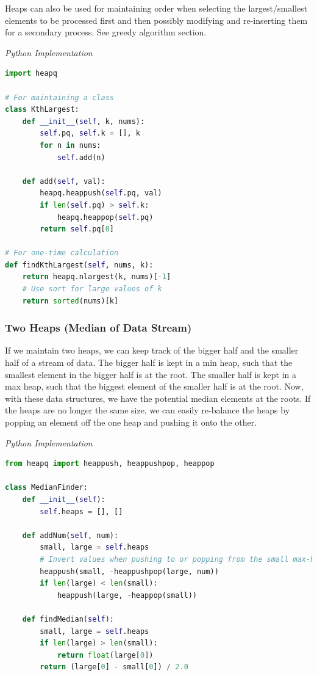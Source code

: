 \documentclass{article}
\begin{document}
    Heaps can also be used for maintaining order when selecting the largest/smallest elements to be processed first and then possibly modifying and re-inserting them for a secondary process. See greedy algorithm section.

\vspace{8pt} \emph{Python Implementation}
\begin{lstlisting}[language=Python]
import heapq

# For maintaining a class 
class KthLargest:
    def __init__(self, k, nums):
        self.pq, self.k = [], k
        for n in nums:
            self.add(n)

    def add(self, val):
        heapq.heappush(self.pq, val)
        if len(self.pq) > self.k:
            heapq.heappop(self.pq)
        return self.pq[0]

# For one-time calculation
def findKthLargest(self, nums, k):
    return heapq.nlargest(k, nums)[-1]
    # Use sort for large values of k
    return sorted(nums)[k]
\end{lstlisting}

    \subsubsection{Two Heaps (Median of Data Stream)}
    If we maintain two heaps, we can keep track of the bigger half and the smaller half of a stream of data. The bigger half is kept in a min heap, such that the smallest element in the bigger half is at the root. The smaller half is kept in a max heap, such that the biggest element of the smaller half is at the root. Now, with these data structures, we have the potential median elements at the roots. If the heaps are no longer the same size, we can easily re-balance the heaps by popping an element off the one heap and pushing it onto the other.

\vspace{8pt} \emph{Python Implementation}
\begin{lstlisting}[language=Python]
from heapq import heappush, heappushpop, heappop

class MedianFinder:
    def __init__(self):
        self.heaps = [], []

    def addNum(self, num):
        small, large = self.heaps
        # Invert values when pushing to or popping from the small max-heap. heapq uses a min heap by default.
        heappush(small, -heappushpop(large, num))
        if len(large) < len(small):
            heappush(large, -heappop(small))

    def findMedian(self):
        small, large = self.heaps
        if len(large) > len(small):
            return float(large[0])
        return (large[0] - small[0]) / 2.0
\end{lstlisting}
\end{document}
